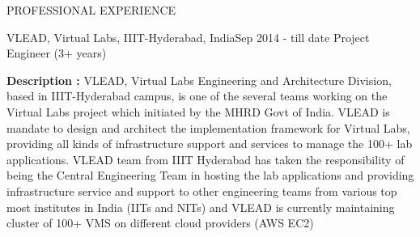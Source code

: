 \documentclass{resume} %
\begin{document}
\begin{rSection}{PROFESSIONAL EXPERIENCE}

   \begin{rSubsection}
    {VLEAD, Virtual Labs, IIIT-Hyderabad, India}{Sep 2014 - till date}
    {Project Engineer} {(3+ years)}

    \textbf{Description
      :} VLEAD, Virtual Labs Engineering and Architecture Division,
    based in IIIT-Hyderabad campus, is one of the several teams
    working on the Virtual Labs project which initiated by the MHRD
    Govt of India. VLEAD is mandate to design and architect the
    implementation framework for Virtual Labs, providing all kinds of
    infrastructure support and services to manage the 100+ lab
    applications. VLEAD team from IIIT Hyderabad has taken the
    responsibility of being the Central Engineering Team in hosting
    the lab applications and providing infrastructure service and
    support to other engineering teams from various top most
    institutes in India (IITs and NITs) and VLEAD is currently
    maintaining cluster of 100+ VMS on different cloud providers (AWS
    EC2) \\
    \break
      



      
      

      

\end{rSubsection}
\end{rSection}
\end{document}
